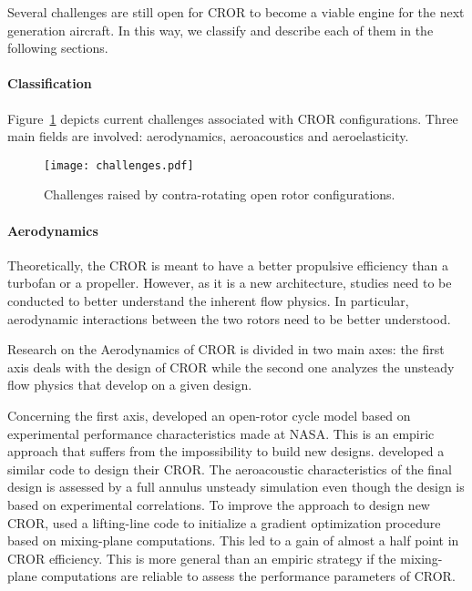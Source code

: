 
Several challenges are still open for CROR
to become a viable engine for the next generation aircraft.
In this way, we classify and describe each of them in the following sections.

\paragraph{Classification}
Figure~\ref{fig:cror_challenges} depicts current challenges associated
with CROR configurations. Three main fields are involved: aerodynamics,
aeroacoustics and aeroelasticity.
\begin{figure}[htp]
  \centering
  \texttt{[image: challenges.pdf]}
  \caption{Challenges raised by contra-rotating open rotor configurations.}
  \label{fig:cror_challenges}
\end{figure}

\paragraph{Aerodynamics}
Theoretically, 
the CROR is meant to have a better propulsive efficiency than a turbofan or a
propeller. However, as it is a new architecture, studies need to be conducted
to better understand the inherent flow physics. In particular,
aerodynamic interactions between the two rotors need to be better understood.

Research on the Aerodynamics of CROR is divided in two main
axes: the first axis deals with the design of CROR while the second
one analyzes the unsteady flow physics that develop on a given design.

Concerning the first axis, 
\citet{Hendricks2011} developed an open-rotor cycle model based
on experimental performance characteristics made at NASA. This is 
an empiric approach that suffers from the impossibility to build new designs.
\citet{Peters2012} developed a similar code to design their CROR. The aeroacoustic
characteristics of the final design is assessed by a 
full annulus unsteady simulation even though the design is 
based on experimental correlations.
To improve the approach to design new CROR, 
\citet{Bechet2011} used a lifting-line code to
initialize a gradient optimization procedure based on mixing-plane
computations. This led to a gain of almost a half point
in CROR efficiency. This is more general than an empiric strategy
if the mixing-plane computations are reliable to assess the performance
parameters of CROR. 

